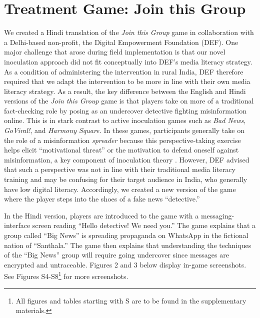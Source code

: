 \documentclass[empirical, authordate, issue]{jote-new-article}
\begin{document}
\section{Treatment Game: Join this Group}

We created a Hindi translation of the \emph{Join this Group} game in collaboration with a Delhi-based non-profit, the Digital Empowerment Foundation (DEF). One major challenge that arose during field implementation is that our novel inoculation approach did not fit conceptually into DEF's media literacy strategy. As a condition of administering the intervention in rural India, DEF therefore required that we adapt the intervention to be more in line with their own media literacy strategy. As a result,\emph{ }the key difference between the English and Hindi versions of the \emph{Join this Group }game is that players take on more of a traditional fact-checking role by posing as an undercover detective fighting misinformation online. This is in stark contrast to active inoculation games such as \emph{Bad News}, \emph{GoViral!}, and \emph{Harmony Square. }In these games, participants generally take on the role of a misinformation \emph{spreader} because this perspective-taking exercise helps elicit “motivational threat” or the motivation to defend oneself against misinformation, a key component of inoculation theory \parencite{Basol2021}. However, DEF advised that such a perspective was not in line with their traditional media literacy training and may be confusing for their target audience in India, who generally have low digital literacy. Accordingly, we created a new version of the game where the player steps into the shoes of a fake news “detective.”

In the Hindi version\emph{, }players are introduced to the game with a messaging-interface screen reading “Hello detective! We need you.” The game explains that a group called “Big News” is spreading propaganda on \mbox{WhatsApp} in the fictional nation of “Santhala.” The game then explains that understanding the techniques of the “Big News” group will require going undercover since messages are encrypted and untraceable. Figures 2 and 3 below display in-game screenshots. See Figures S4-S8\footnote{All figures and tables starting with S are to be found in the supplementary materials.} for more screenshots.
\end{document}
